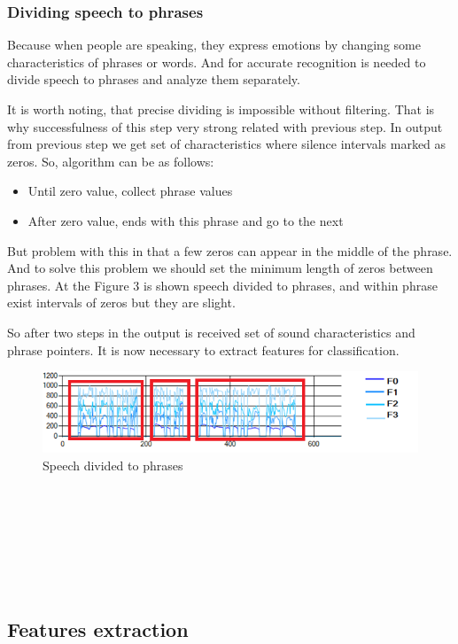 \documentclass[12pt, letterpaper]{article}
\begin{document}
\subsubsection{Dividing speech to phrases}

Because when people are speaking, they express emotions by changing some characteristics of phrases or words. And for accurate recognition is needed to divide speech to phrases and analyze them separately.

It is worth noting, that precise dividing is impossible without filtering. That is why successfulness of  this step very strong related with previous step. In output from previous step we get set of characteristics where silence intervals marked as zeros. So, algorithm can be as follows: 

 \begin{itemize}
	 \item Until zero value, collect phrase values
		\item After zero value, ends with this phrase and go to the next
 \end{itemize}

But problem with this in that a few zeros can appear in the middle of the phrase. And to solve this problem we should set the minimum length of zeros between phrases. At the Figure 3 is shown speech divided to phrases, and within phrase exist intervals of zeros but they are slight. 

So after two steps in the output is received set of sound characteristics and phrase pointers. It is now necessary to extract features for classification.
\begin{figure}
	\centering
		\includegraphics[scale=1]{images/phrases.png}
	\caption{Speech divided to phrases}
	\label{fig:phrases}
\end{figure}
\\
\\
\\
\\
\\
\\

\subsection{Features extraction}
\end{document}

